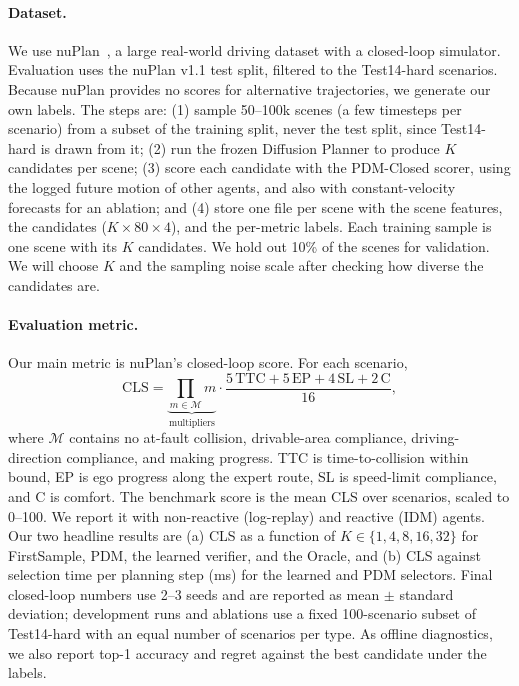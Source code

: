 \documentclass{article}
\begin{document}
\paragraph{Dataset.}
We use nuPlan~\cite{caesar2021nuplan}, a large real-world driving dataset with a closed-loop simulator. Evaluation uses the nuPlan v1.1 test split, filtered to the Test14-hard scenarios. Because nuPlan provides no scores for alternative trajectories, we generate our own labels. The steps are:
(1) sample 50--100k scenes (a few timesteps per scenario) from a subset of the training split, never the test split, since Test14-hard is drawn from it;
(2) run the frozen Diffusion Planner to produce $K$ candidates per scene;
(3) score each candidate with the PDM-Closed scorer, using the logged future motion of other agents, and also with constant-velocity forecasts for an ablation; and
(4) store one file per scene with the scene features, the candidates ($K\times80\times4$), and the per-metric labels.
Each training sample is one scene with its $K$ candidates. We hold out 10\% of the scenes for validation. We will choose $K$ and the sampling noise scale after checking how diverse the candidates are.

\paragraph{Evaluation metric.}
Our main metric is nuPlan's closed-loop score. For each scenario,
\begin{equation}
\text{CLS} = \underbrace{\prod_{m\in\mathcal{M}} m}_{\text{multipliers}} \cdot \frac{5\,\text{TTC} + 5\,\text{EP} + 4\,\text{SL} + 2\,\text{C}}{16},
\label{eq:cls}
\end{equation}
where $\mathcal{M}$ contains no at-fault collision, drivable-area compliance, driving-direction compliance, and making progress. TTC is time-to-collision within bound, EP is ego progress along the expert route, SL is speed-limit compliance, and C is comfort. The benchmark score is the mean CLS over scenarios, scaled to 0--100. We report it with non-reactive (log-replay) and reactive (IDM) agents. Our two headline results are (a) CLS as a function of $K\in\{1,4,8,16,32\}$ for FirstSample, PDM, the learned verifier, and the Oracle, and (b) CLS against selection time per planning step (ms) for the learned and PDM selectors. Final closed-loop numbers use 2--3 seeds and are reported as mean $\pm$ standard deviation; development runs and ablations use a fixed 100-scenario subset of Test14-hard with an equal number of scenarios per type. As offline diagnostics, we also report top-1 accuracy and regret against the best candidate under the labels.
\end{document}
